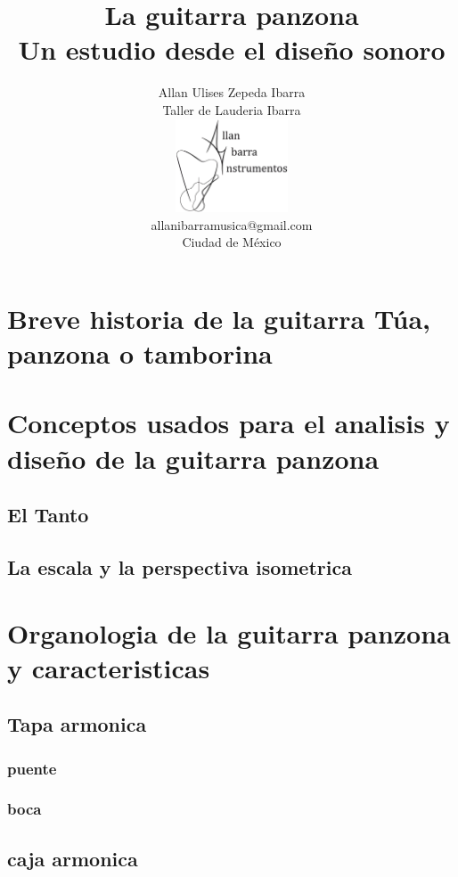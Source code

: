 \documentclass[a4paper]{article}
\title{La guitarra panzona \\
    \large Un estudio desde el diseño sonoro}
\author{Allan Ulises Zepeda Ibarra\\
\small Taller de Lauderia Ibarra\\
\small \includegraphics[width=0.25\textwidth]{./img/logo.jpg}\\
  \small allanibarramusica@gmail.com\\
  \small Ciudad de México
  \date{}
}
\begin{document}
\maketitle

\begin{abstract}

\end{abstract}

\section{Breve historia de la guitarra Túa, panzona o tamborina}
\cite{martinez-ayala-2022}

\section{Conceptos usados para el analisis y diseño de la guitarra panzona}

\subsection{El Tanto}




\subsection{La escala y la perspectiva isometrica}
% 
% 
% 


\section{Organologia de la guitarra panzona y caracteristicas}
\subsection{Tapa armonica}
\subsubsection{puente}
\subsubsection{boca}
\subsection{caja armonica}
\end{document}
